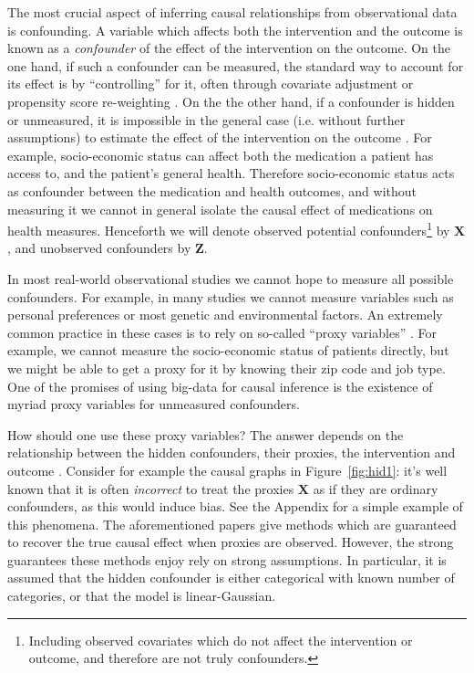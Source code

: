 \documentclass{article}
\def\*#1{\mathbf{#1}}
\begin{document}
The most crucial aspect of inferring causal relationships from observational data is confounding. A variable which affects both the intervention and the outcome is known as a \emph{confounder} of the effect of the intervention on the outcome. On the one hand, if such a confounder can be measured, the standard way to account for its effect is by ``controlling'' for it, often through covariate adjustment or propensity score re-weighting \citep{morgan2014counterfactuals}. On the the other hand, if a confounder is hidden or unmeasured, it is impossible in the general case (i.e. without further assumptions) to estimate the effect of the intervention on the outcome \citep{pearl2009causality}. For example, socio-economic status can affect both the medication a patient has access to, and the patient's general health. Therefore socio-economic status acts as confounder between the medication and health outcomes, and without measuring it we cannot in general isolate the causal effect of medications on health measures. Henceforth we will denote observed potential confounders\footnote{Including observed covariates which do not affect the intervention or outcome, and therefore are not truly confounders.} by $\*X$, and unobserved confounders by $\*Z$. 


In most real-world observational studies we cannot hope to measure all possible confounders. For example, in many studies we cannot measure variables such as personal preferences or most genetic and environmental factors. An extremely common practice in these cases is to rely on so-called ``proxy variables'' \cite[Ch. 11]{montgomery2000measuring,angrist2008mostly,maddala1992introduction}. For example, we cannot measure the socio-economic status of patients directly, but we might be able to get a proxy for it by knowing their zip code and job type. One of the promises of using big-data for causal inference is the existence of myriad proxy variables for unmeasured confounders. 

How should one use these proxy variables? The answer depends on the relationship between the hidden confounders, their proxies, the intervention and outcome \citep{kuroki2011measurement,miao2016identifying}. Consider for example the causal graphs in Figure~\ref{fig:hid1}: it's well known \citep{griliches1986errors,fuller1987measurement,greenland2008bias,kuroki2011measurement,pearl2012measurement} that it is often \emph{incorrect} to treat the proxies $\*X$ as if they are ordinary confounders, as this would induce bias. See the Appendix for a simple example of this phenomena. The aforementioned papers give methods which are guaranteed to recover the true causal effect when proxies are observed. However, the strong guarantees these methods enjoy rely on strong assumptions. In particular, it is assumed that the hidden confounder is either categorical with known number of categories, or that the model is linear-Gaussian. 
\end{document}
